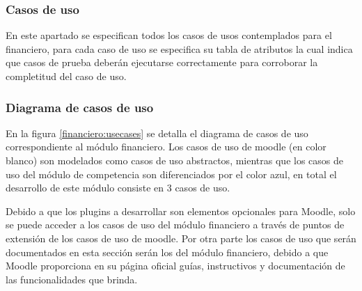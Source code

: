 

\clearpage
\subsubsection{Casos de uso} %

 En este apartado se especifican todos los casos de usos contemplados para el financiero,
 para cada caso de uso se especifica su tabla de atributos la cual indica que casos
 de prueba deberán ejecutarse correctamente para corroborar la completitud del caso de uso.

\subsubsection*{Diagrama de casos de uso}

 En la figura \ref{financiero:usecases} se detalla el diagrama de casos de uso correspondiente al módulo
financiero. Los casos de uso de moodle (en color blanco) son modelados como casos de uso
 abstractos, mientras que los casos de uso del módulo de competencia son diferenciados por el
 color azul, en total el desarrollo de este módulo consiste en 3 casos de uso.


 \noindent
 Debido a que los plugins a desarrollar son elementos opcionales para Moodle, solo se puede
 acceder a los casos de uso del módulo financiero a través de puntos de extensión de los
 casos de uso de moodle. Por otra parte los casos de uso que serán documentados en esta sección
 serán los del módulo financiero, debido a que Moodle proporciona en su página oficial guías,
 instructivos y documentación de las funcionalidades que brinda.


